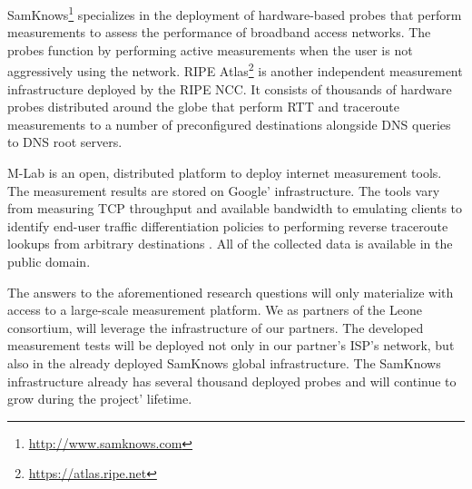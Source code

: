 SamKnows\footnote{\url{http://www.samknows.com}} specializes in the deployment
of hardware-based probes that perform measurements to assess the performance
of broadband access networks. The probes function by performing active
measurements when the user is not aggressively using the network.  RIPE
Atlas\footnote{\url{https://atlas.ripe.net}} is another independent
measurement infrastructure deployed by the \ac{RIPE NCC}. It consists of
thousands of hardware probes distributed around the globe that perform
\ac{RTT} and traceroute measurements to a number of preconfigured destinations
alongside DNS queries to DNS root servers.

\ac{M-Lab} \cite{dovrolis:2010} is an open, distributed platform to deploy
internet measurement tools. The measurement results are stored on Google'
infrastructure. The tools vary from measuring TCP throughput and available
bandwidth to emulating clients to identify end-user traffic differentiation
policies \cite{dischinger:2010, kanuparthy:2011} to performing reverse
traceroute lookups from arbitrary destinations \cite{bassett:2010}.  All of
the collected data is available in the public domain.

The answers to the aforementioned research questions will only materialize
with access to a large-scale measurement platform. We as partners of the Leone
consortium, will leverage the infrastructure of our partners. The developed
measurement tests will be deployed not only in our partner's \ac{ISP}'s
network, but also in the already deployed SamKnows global infrastructure.  The
SamKnows infrastructure already has several thousand deployed probes and will
continue to grow during the project' lifetime.
